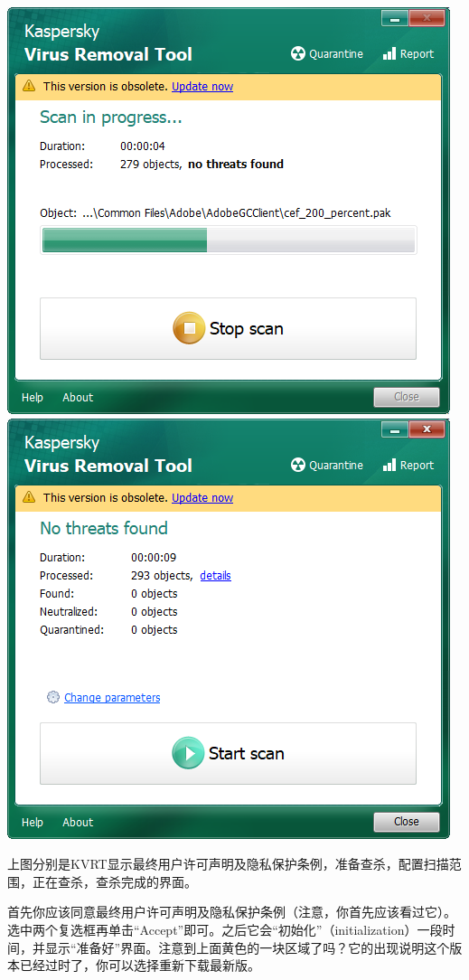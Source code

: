 \begin{center}
	\includegraphics[scale=0.4]{pic/kvrt_ing.PNG}    \includegraphics[scale=0.4]{pic/kvrt_compl.PNG}
\end{center} \par
上图分别是KVRT显示最终用户许可声明及隐私保护条例，准备查杀，配置扫描范围，正在查杀，查杀完成的界面。\par
首先你应该同意最终用户许可声明及隐私保护条例（注意，你首先应该看过它）。选中两个复选框再单击“Accept”即可。之后它会“初始化”（initialization）一段时间，并显示“准备好”界面。注意到上面黄色的一块区域了吗？它的出现说明这个版本已经过时了，你可以选择重新下载最新版。\par
